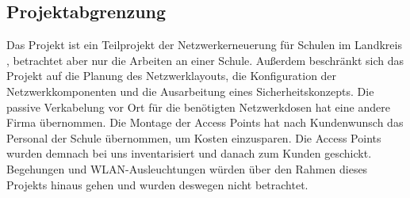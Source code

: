 \subsection{Projektabgrenzung} 
\label{sec:Projektabgrenzung}
Das Projekt ist ein Teilprojekt der Netzwerkerneuerung für Schulen im Landkreis , betrachtet aber nur die Arbeiten an einer Schule. 
Außerdem beschränkt sich das Projekt auf die Planung des Netzwerklayouts, die Konfiguration der Netzwerkkomponenten und die Ausarbeitung eines Sicherheitskonzepts. 
Die passive Verkabelung vor Ort für die benötigten Netzwerkdosen hat eine andere Firma übernommen. 
Die Montage der Access Points hat nach Kundenwunsch das Personal der Schule übernommen, um Kosten einzusparen. 
Die Access Points wurden demnach bei uns inventarisiert und danach zum Kunden geschickt. 
Begehungen und WLAN-Ausleuchtungen würden über den Rahmen dieses Projekts hinaus gehen und wurden deswegen nicht betrachtet.
\begin{comment}
	\item Was ist explizit nicht Teil des Projekts (\insb bei Teilprojekten)?
\end{comment}
